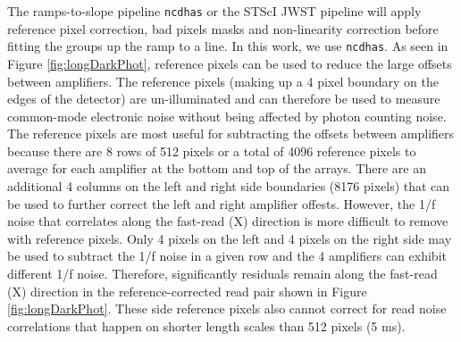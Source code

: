 \documentclass{aastex62}
\begin{document}
The ramps-to-slope pipeline \texttt{ncdhas} or the STScI JWST pipeline will apply reference pixel correction, bad pixels masks and non-linearity correction before fitting the groups up the ramp to a line.
In this work, we use \texttt{ncdhas}.
As seen in Figure \ref{fig:longDarkPhot}, reference pixels can be used to reduce the large offsets between amplifiers.
The reference pixels (making up a 4 pixel boundary on the edges of the detector) are un-illuminated and can therefore be used to measure common-mode electronic noise without being affected by photon counting noise.
The reference pixels are most useful for subtracting the offsets between amplifiers because there are 8 rows of 512 pixels or a total of 4096 reference pixels to average for each amplifier at the bottom and top of the arrays.
There are an additional 4 columns on the left and right side boundaries (8176 pixels) that can be used to further correct the left and right amplifier offests.
However, the 1/f noise that correlates along the fast-read (X) direction is more difficult to remove with reference pixels.
Only 4 pixels on the left and 4 pixels on the right side may be used to subtract the 1/f noise in a given row and the 4 amplifiers can exhibit different 1/f noise. 
Therefore, significantly residuals remain along the fast-read (X) direction in the reference-corrected read pair shown in Figure \ref{fig:longDarkPhot}.
These side reference pixels also cannot correct for read noise correlations that happen on shorter length scales than 512 pixels (5 ms).
\end{document}
